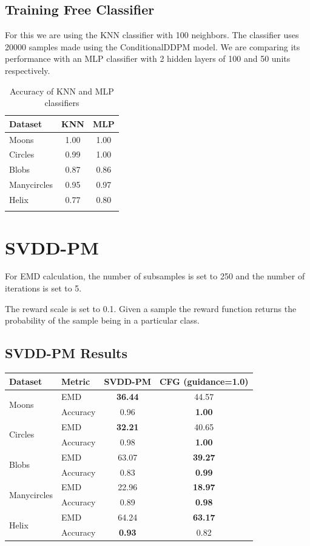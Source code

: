 \documentclass[11pt]{article}
\begin{document}
\subsection{Training Free Classifier}

For this we are using the KNN classifier with 100 neighbors. The classifier uses 20000 samples made using the ConditionalDDPM model.
We are comparing its performance with an MLP classifier with 2 hidden layers of 100 and 50 units respectively.

\begin{longtable}{|l|c|c|}
    \hline
    \textbf{Dataset} & \textbf{KNN} & \textbf{MLP} \\
    \hline
    Moons & 1.00 & 1.00 \\
    Circles & 0.99 & 1.00 \\
    Blobs & 0.87 & 0.86 \\
    Manycircles & 0.95 & 0.97 \\
    Helix & 0.77 & 0.80 \\
    \hline
    \caption{Accuracy of KNN and MLP classifiers}
\end{longtable}

\section{SVDD-PM}
For EMD calculation, the number of subsamples is set to 250 and the number of iterations is set to 5.

The reward scale is set to 0.1. Given a sample the reward function returns the probability of the sample being in a particular class.

\subsection{SVDD-PM Results}
\begin{longtable}{|l|l|c|c|}
    \hline
    \textbf{Dataset} & \textbf{Metric} & \textbf{SVDD-PM} & \textbf{CFG (guidance=1.0)} \\
    \hline
    \multirow{2}{*}{Moons} & EMD & \textbf{36.44} & 44.57 \\
    \cline{2-4}
    & Accuracy & 0.96 & \textbf{1.00} \\
    \hline
    \multirow{2}{*}{Circles} & EMD & \textbf{32.21} & 40.65 \\
    \cline{2-4}
    & Accuracy & 0.98 & \textbf{1.00} \\
    \hline
    \multirow{2}{*}{Blobs} & EMD & 63.07 & \textbf{39.27} \\
    \cline{2-4}
    & Accuracy & 0.83 & \textbf{0.99} \\
    \hline
    \multirow{2}{*}{Manycircles} & EMD & 22.96 & \textbf{18.97} \\
    \cline{2-4}
    & Accuracy & 0.89 & \textbf{0.98} \\
    \hline
    \multirow{2}{*}{Helix} & EMD & 64.24 & \textbf{63.17} \\
    \cline{2-4}
    & Accuracy & \textbf{0.93} & 0.82 \\
    \hline
\end{longtable}
\end{document}
